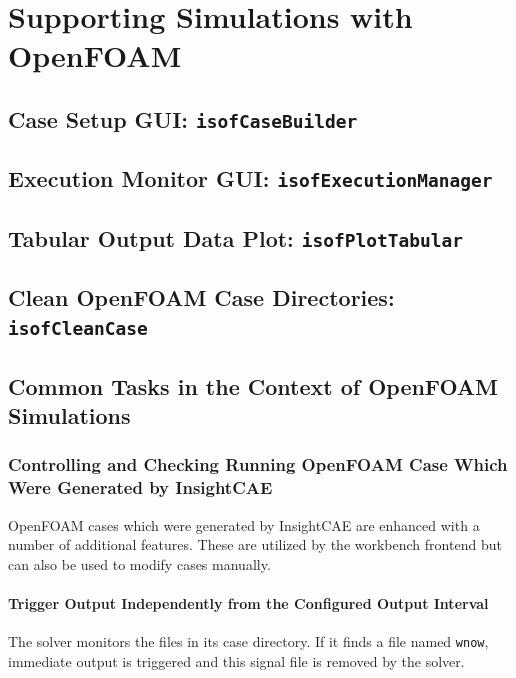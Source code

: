 \section{Supporting Simulations with OpenFOAM}

\subsection{Case Setup GUI: \texttt{isofCaseBuilder}}

\subsection{Execution Monitor GUI: \texttt{isofExecutionManager}}

\subsection{Tabular Output Data Plot: \texttt{isofPlotTabular}}

\subsection{Clean OpenFOAM Case Directories: \texttt{isofCleanCase}}
\label{sec:isofcleancase}





\subsection{Common Tasks in the Context of OpenFOAM Simulations}

\subsubsection{Controlling and Checking Running OpenFOAM Case Which Were Generated by InsightCAE}

OpenFOAM cases which were generated by InsightCAE are enhanced with a number of additional features.
These are utilized by the workbench frontend but can also be used to modify cases manually.

\paragraph{Trigger Output Independently from the Configured Output Interval}
\label{par:trigger_output_of}
\label{par:wnow}

The solver monitors the files in its case directory.
If it finds a file named \verb!wnow!, immediate output is triggered and this signal file is removed by the solver.

